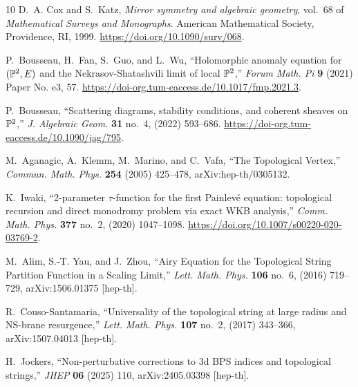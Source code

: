 \documentclass[a4paper,12pt,justification=centering]{article}
\numberwithin{equation}{section}
\providecommand{\href}[2]{#2}
\theoremstyle{plain}%
\theoremstyle{definition}
\begin{document}
\begin{thebibliography}{10}
D.~A. Cox and S.~Katz, \href{http://dx.doi.org/10.1090/surv/068}{{\em Mirror
  symmetry and algebraic geometry}}, vol.~68 of {\em Mathematical Surveys and
  Monographs}.
\newblock American Mathematical Society, Providence, RI, 1999.
\newblock \url{https://doi.org/10.1090/surv/068}.

P.~Bousseau, H.~Fan, S.~Guo, and L.~Wu, ``Holomorphic anomaly equation for
  {$(\Bbb P^2,E)$} and the {N}ekrasov-{S}hatashvili limit of local {$\Bbb
  P^2$},'' \href{http://dx.doi.org/10.1017/fmp.2021.3}{{\em Forum Math. Pi}
  {\bfseries 9} (2021) Paper No. e3, 57}.
  \url{https://doi-org.tum-eaccess.de/10.1017/fmp.2021.3}.

P.~Bousseau, ``Scattering diagrams, stability conditions, and coherent sheaves
  on {$\Bbb P^2$},'' \href{http://dx.doi.org/10.1090/jag/795}{{\em J. Algebraic
  Geom.} {\bfseries 31} no.~4, (2022) 593--686}.
  \url{https://doi-org.tum-eaccess.de/10.1090/jag/795}.

M.~Aganagic, A.~Klemm, M.~Marino, and C.~Vafa, ``{The Topological Vertex},''
  \href{http://dx.doi.org/10.1007/s00220-004-1162-z}{{\em Commun. Math. Phys.}
  {\bfseries 254} (2005) 425--478},
  \href{http://arxiv.org/abs/hep-th/0305132}{{\ttfamily arXiv:hep-th/0305132}}.

K.~Iwaki, ``2-parameter {$\tau$}-function for the first {P}ainlev\'e{}
  equation: topological recursion and direct monodromy problem via exact {WKB}
  analysis,'' \href{http://dx.doi.org/10.1007/s00220-020-03769-2}{{\em Comm.
  Math. Phys.} {\bfseries 377} no.~2, (2020) 1047--1098}.
  \url{https://doi.org/10.1007/s00220-020-03769-2}.

M.~Alim, S.-T. Yau, and J.~Zhou, ``{Airy Equation for the Topological String
  Partition Function in a Scaling Limit},''
  \href{http://dx.doi.org/10.1007/s11005-016-0840-z}{{\em Lett. Math. Phys.}
  {\bfseries 106} no.~6, (2016) 719--729},
  \href{http://arxiv.org/abs/1506.01375}{{\ttfamily arXiv:1506.01375
  [hep-th]}}.

R.~Couso-Santamaria, ``{Universality of the topological string at large radius
  and NS-brane resurgence},''
  \href{http://dx.doi.org/10.1007/s11005-016-0906-y}{{\em Lett. Math. Phys.}
  {\bfseries 107} no.~2, (2017) 343--366},
  \href{http://arxiv.org/abs/1507.04013}{{\ttfamily arXiv:1507.04013
  [hep-th]}}.

H.~Jockers, ``{Non-perturbative corrections to 3d BPS indices and topological
  strings},'' \href{http://dx.doi.org/10.1007/JHEP06(2025)110}{{\em JHEP}
  {\bfseries 06} (2025) 110}, \href{http://arxiv.org/abs/2405.03398}{{\ttfamily
  arXiv:2405.03398 [hep-th]}}.


\end{thebibliography}
\end{document}
